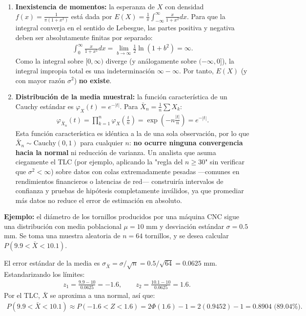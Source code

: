 \begin{solproblema}[prob:293fd20]
	\begin{enumerate}
		\item \textbf{Inexistencia de momentos:} la esperanza de $X$ con densidad $f(x) = \frac{1}{\pi(1+x^2)}$ está dada por $E(X) = \frac{1}{\pi}\int_{-\infty}^{\infty} \frac{x}{1+x^2}dx$. Para que la integral converja en el sentido de Lebesgue, las partes positiva y negativa deben ser absolutamente finitas por separado:
		\begin{align}
			\int_0^{\infty} \frac{x}{1+x^2} dx = \lim_{b \to \infty} \frac{1}{2}\ln(1+b^2) = \infty.
		\end{align}
		Como la integral sobre $[0,\infty)$ diverge (y análogamente sobre $(-\infty,0]$), la integral impropia total es una indeterminación $\infty - \infty$. Por tanto, $E(X)$ (y con mayor razón $\sigma^2$) \textbf{no existe}.

		\item \textbf{Distribución de la media muestral:} la función característica de un Cauchy estándar es $\varphi_X(t) = e^{-|t|}$. Para $\bar{X}_n = \frac{1}{n}\sum X_k$:
		\begin{align}
			\varphi_{\bar{X}_n}(t) = \prod_{k=1}^n \varphi_X\left(\frac{t}{n}\right) = \exp\left(-n\frac{|t|}{n}\right) = e^{-|t|}.
		\end{align}
		Esta función característica es idéntica a la de una sola observación, por lo que $\bar{X}_n \sim \text{Cauchy}(0,1)$ para cualquier $n$: \textbf{no ocurre ninguna convergencia hacia la normal} ni reducción de varianza. Un analista que asuma ciegamente el TLC (por ejemplo, aplicando la "regla del $n\ge30$" sin verificar que $\sigma^2<\infty$) sobre datos con colas extremadamente pesadas —comunes en rendimientos financieros o latencias de red— construiría intervalos de confianza y pruebas de hipótesis completamente inválidos, ya que promediar más datos no reduce el error de estimación en absoluto.
	\end{enumerate}
\end{solproblema}

\begin{solproblema}[prob:b7567ec]
	\textbf{Ejemplo:} el diámetro de los tornillos producidos por una máquina CNC sigue una distribución con media poblacional $\mu = 10$ mm y desviación estándar $\sigma = 0.5$ mm. Se toma una muestra aleatoria de $n = 64$ tornillos, y se desea calcular $P(9.9 < \bar{X} < 10.1)$.

	El error estándar de la media es $\sigma_{\bar{X}} = \sigma/\sqrt{n} = 0.5/\sqrt{64} = 0.0625$ mm. Estandarizando los límites:
	\begin{align}
		z_1 = \frac{9.9-10}{0.0625} = -1.6, \qquad z_2 = \frac{10.1-10}{0.0625} = 1.6.
	\end{align}
	Por el TLC, $\bar{X}$ se aproxima a una normal, así que:
	\begin{align}
		P(9.9 < \bar{X} < 10.1) \approx P(-1.6 < Z < 1.6) = 2\Phi(1.6) - 1 = 2(0.9452) - 1 = 0.8904 \text{ (89.04\%).}
	\end{align}
\end{solproblema}
